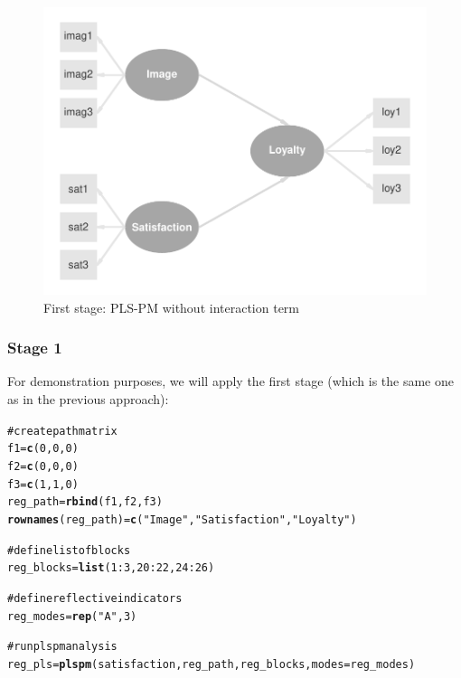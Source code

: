 \documentclass[12pt]{book}\usepackage{graphicx, color}
\makeatletter
\newcommand{\hlfunctioncall}[1]{\textcolor[rgb]{0.501960784313725,0,0.329411764705882}{\textbf{#1}}}%
\newcommand{\hlstring}[1]{\textcolor[rgb]{0.6,0.6,1}{#1}}%
\newcommand{\hlcomment}[1]{\textcolor[rgb]{0.180392156862745,0.6,0.341176470588235}{#1}}%
\newenvironment{kframe}{%
 \def\at@end@of@kframe{}%
 \ifinner\ifhmode%
  \def\at@end@of@kframe{\end{minipage}}%
  \begin{minipage}{\columnwidth}%
 \fi\fi%
 \def\FrameCommand##1{\hskip\@totalleftmargin \hskip-\fboxsep
 \colorbox{shadecolor}{##1}\hskip-\fboxsep
     \hskip-\linewidth \hskip-\@totalleftmargin \hskip\columnwidth}%
 \MakeFramed {\advance\hsize-\width
   \@totalleftmargin\z@ \linewidth\hsize
   \@setminipage}}%
 {\par\unskip\endMakeFramed%
 \at@end@of@kframe}
\newenvironment{knitrout}{}{} %
\makeatother
\begin{document}
\begin{knitrout}
\color{fgcolor}\begin{figure}[h]


{\centering \includegraphics[width=.7\linewidth,height=.45\linewidth]{figure/TwoStageReg1_diag} 

}

\caption[First stage]{First stage: PLS-PM without interaction term\label{fig:TwoStageReg1_diag}}
\end{figure}


\end{knitrout}



\subsubsection*{Stage 1}
For demonstration purposes, we will apply the first stage (which is the same one as in the previous approach):
\begin{knitrout}
\color{fgcolor}\begin{kframe}
\begin{alltt}
\hlcomment{# create path matrix}
f1 = \hlfunctioncall{c}(0, 0, 0)
f2 = \hlfunctioncall{c}(0, 0, 0)
f3 = \hlfunctioncall{c}(1, 1, 0)
reg_path = \hlfunctioncall{rbind}(f1, f2, f3)
\hlfunctioncall{rownames}(reg_path) = \hlfunctioncall{c}(\hlstring{"Image"}, \hlstring{"Satisfaction"}, \hlstring{"Loyalty"})

\hlcomment{# define list of blocks}
reg_blocks = \hlfunctioncall{list}(1:3, 20:22, 24:26)

\hlcomment{# define reflective indicators}
reg_modes = \hlfunctioncall{rep}(\hlstring{"A"}, 3)

\hlcomment{# run plspm analysis}
reg_pls = \hlfunctioncall{plspm}(satisfaction, reg_path, reg_blocks, modes = reg_modes)
\end{alltt}
\end{kframe}
\end{knitrout}
\end{document}
